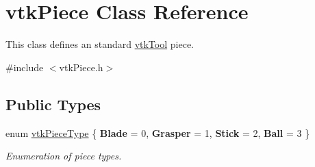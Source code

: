\hypertarget{classvtkPiece}{
\section{vtkPiece Class Reference}
\label{classvtkPiece}
}


This class defines an standard \hyperlink{classvtkTool}{vtkTool} piece.  




{\ttfamily \#include $<$vtkPiece.h$>$}

\subsection*{Public Types}
\begin{DoxyCompactItemize}
\item 
enum \hyperlink{classvtkPiece_a50da923e79e96537b7676a68947aa858}{vtkPieceType} \{ {\bfseries Blade} =  0, 
{\bfseries Grasper} =  1, 
{\bfseries Stick} =  2, 
{\bfseries Ball} =  3
 \}
\begin{DoxyCompactList}\small\item\em Enumeration of piece types. \item\end{DoxyCompactList}\end{DoxyCompactItemize}
